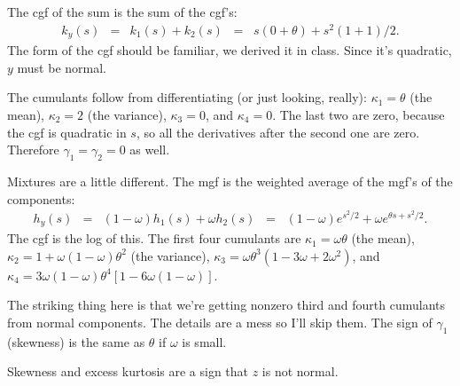\documentclass[11pt]{exam}
\begin{document}
\begin{questions}
\begin{solution}
\begin{parts}
\item The cgf of the sum is the sum of the cgf's:
\begin{eqnarray*}
     k_y(s) &=& k_1(s) + k_2(s)
        \;\;=\;\; s (0 + \theta) + s^2 (1 + 1)/2 .
\end{eqnarray*}
The form of the cgf should be familiar, we derived it in class.
Since it's quadratic, $y$ must be normal.

The cumulants follow from differentiating (or just looking, really):
$\kappa_1 = \theta $ (the mean),
$\kappa_2 = 2 $ (the variance),
$\kappa_3 = 0$,
and $\kappa_4 = 0$.
The last two are zero, because the cgf is quadratic in $s$,
so all the derivatives after the second one are zero.
Therefore $\gamma_1 = \gamma_2 = 0$ as well.

\item Mixtures are a little different.
The mgf is the weighted average of the mgf's of the components:
\begin{eqnarray*}
    h_y(s) &=& (1-\omega)h_1(s)  + \omega h_2(s)
        \;\;=\;\; (1-\omega)e^{s^2/2} + \omega e^{\theta s + s^2/ 2} .
\end{eqnarray*}
The cgf is the log of this.
The first four cumulants are
$\kappa_1 = \omega \theta $ (the mean),
$\kappa_2 = 1 + \omega (1-\omega)\theta^2  $ (the variance),
$\kappa_3 = \omega \theta^3 (1 - 3 \omega + 2 \omega^2)$,
and
$\kappa_4 = 3 \omega (1-\omega) \theta^4 [1 - 6\omega (1-\omega) ]$.

The striking thing here is that we're getting nonzero third and fourth
cumulants from normal components.
The details are a mess so I'll skip them.
The sign of $\gamma_1$ (skewness) is the same as $\theta$
if $\omega$ is small.

\item Skewness and excess kurtosis are a sign that $ z$ is not normal.
\end{parts}
\end{solution}



\end{questions}
\end{document}
